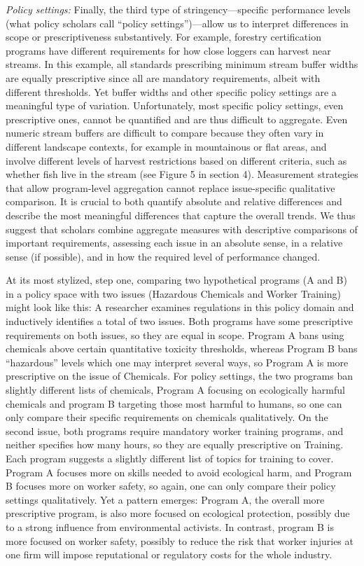 \documentclass[
      12pt,
            Review ]{article}
\begin{document}
\emph{Policy settings:} Finally, the third type of stringency---specific
performance levels (what policy scholars call ``policy
settings'')---allow us to interpret differences in scope or
prescriptiveness substantively. For example, forestry certification
programs have different requirements for how close loggers can harvest
near streams. In this example, all standards prescribing minimum stream
buffer widths are equally prescriptive since all are mandatory
requirements, albeit with different thresholds. Yet buffer widths and
other specific policy settings are a meaningful type of variation.
Unfortunately, most specific policy settings, even prescriptive ones,
cannot be quantified and are thus difficult to aggregate. Even numeric
stream buffers are difficult to compare because they often vary in
different landscape contexts, for example in mountainous or flat areas,
and involve different levels of harvest restrictions based on different
criteria, such as whether fish live in the stream (see Figure 5 in
section 4). Measurement strategies that allow program-level aggregation
cannot replace issue-specific qualitative comparison. It is crucial to
both quantify absolute and relative differences and describe the most
meaningful differences that capture the overall trends. We thus suggest
that scholars combine aggregate measures with descriptive comparisons of
important requirements, assessing each issue in an absolute sense, in a
relative sense (if possible), and in how the required level of
performance changed.

At its most stylized, step one, comparing two hypothetical programs (A
and B) in a policy space with two issues (Hazardous Chemicals and Worker
Training) might look like this: A researcher examines regulations in
this policy domain and inductively identifies a total of two issues.
Both programs have some prescriptive requirements on both issues, so
they are equal in scope. Program A bans using chemicals above certain
quantitative toxicity thresholds, whereas Program B bans ``hazardous''
levels which one may interpret several ways, so Program A is more
prescriptive on the issue of Chemicals. For policy settings, the two
programs ban slightly different lists of chemicals, Program A focusing
on ecologically harmful chemicals and program B targeting those most
harmful to humans, so one can only compare their specific requirements
on chemicals qualitatively. On the second issue, both programs require
mandatory worker training programs, and neither specifies how many
hours, so they are equally prescriptive on Training. Each program
suggests a slightly different list of topics for training to cover.
Program A focuses more on skills needed to avoid ecological harm, and
Program B focuses more on worker safety, so again, one can only compare
their policy settings qualitatively. Yet a pattern emerges: Program A,
the overall more prescriptive program, is also more focused on
ecological protection, possibly due to a strong influence from
environmental activists. In contrast, program B is more focused on
worker safety, possibly to reduce the risk that worker injuries at one
firm will impose reputational or regulatory costs for the whole
industry.
\end{document}
